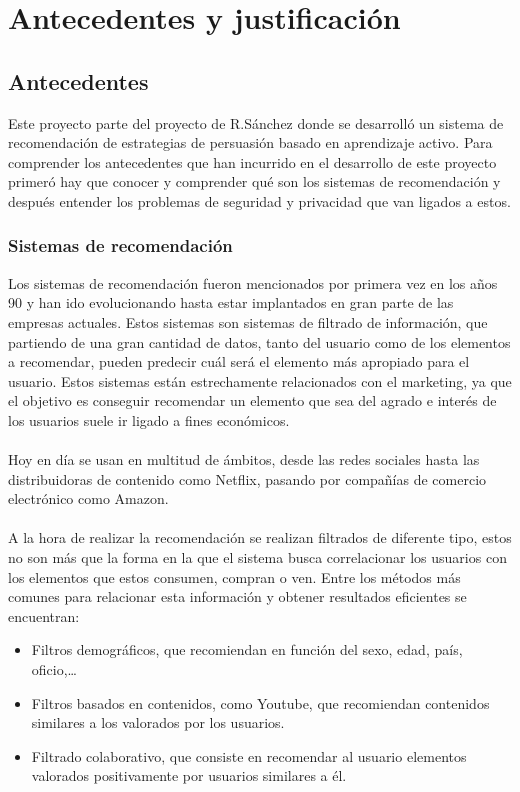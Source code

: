 \chapter{Antecedentes y justificación}
\thispagestyle{fancy}

\section{Antecedentes}
Este proyecto parte del proyecto de R.Sánchez\autocite{sanchez-corcueraPersuasionbasedRecommenderSystem2020} donde se desarrolló un sistema de recomendación de estrategias de persuasión basado en aprendizaje activo. Para comprender los antecedentes que han incurrido en el desarrollo de este proyecto primeró hay que conocer y comprender qué son los sistemas de recomendación y después entender los problemas de seguridad y privacidad que van ligados a estos. 
\subsection{Sistemas de recomendación}
Los sistemas de recomendación fueron mencionados por primera vez en los años 90 y han ido evolucionando hasta estar implantados en gran parte de las empresas actuales. Estos sistemas son sistemas de filtrado de información, que partiendo de una gran cantidad de datos, tanto del usuario como de los elementos a recomendar, pueden predecir cuál será el elemento más apropiado para el usuario. Estos sistemas están estrechamente relacionados con el marketing, ya que el objetivo es conseguir recomendar un elemento que sea del agrado e interés de los usuarios suele ir ligado a fines económicos.
\\ \\
Hoy en día se usan en multitud de ámbitos, desde las redes sociales hasta las distribuidoras de contenido como Netflix, pasando por compañías de comercio electrónico como Amazon. 
\\ \\
A la hora de realizar la recomendación se realizan filtrados de diferente tipo, estos no son más que la forma en la que el sistema busca correlacionar los usuarios con los elementos que estos consumen, compran o ven. Entre los métodos más comunes para relacionar esta información y obtener resultados eficientes se encuentran:
\begin{itemize}
    \item Filtros demográficos, que recomiendan en función del sexo, edad, país, oficio,… 
    \item Filtros basados en contenidos, como Youtube, que recomiendan contenidos similares a los valorados por los usuarios. 
    \item Filtrado colaborativo, que consiste en recomendar al usuario elementos valorados positivamente por usuarios similares a él. 
\end{itemize}

